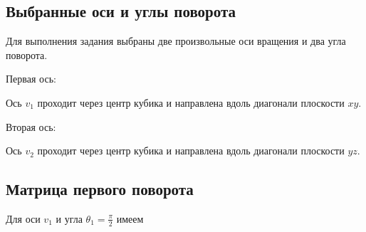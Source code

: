 \documentclass[a4paper,14pt]{extarticle}
\begin{document}
\subsection*{Выбранные оси и углы поворота}

Для выполнения задания выбраны две произвольные оси вращения и два угла поворота.

Первая ось:

\begin{center}\end{center}

Ось $v_1$ проходит через центр кубика и направлена вдоль диагонали плоскости $xy$.

Вторая ось:

\begin{center}\end{center}

Ось $v_2$ проходит через центр кубика и направлена вдоль диагонали плоскости $yz$.

\subsection*{Матрица первого поворота}

Для оси $v_1$ и угла $\theta_1=\frac{\pi}{2}$ имеем

\begin{center}\end{center}
\end{document}
